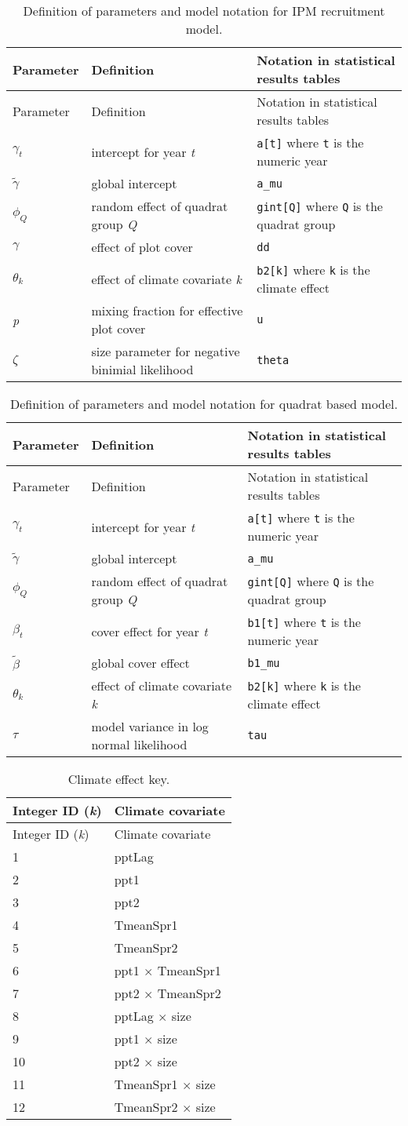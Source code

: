 \documentclass[12pt,]{article}
\begin{document}
\begin{longtable}[c]{@{}lll@{}}
\caption{Definition of parameters and model notation for IPM recruitment
model.}\tabularnewline
\toprule
Parameter & Definition & Notation in statistical results
tables\tabularnewline
\midrule
\endfirsthead
\toprule
Parameter & Definition & Notation in statistical results
tables\tabularnewline
\midrule
\endhead
\(\gamma_{t}\) & intercept for year \emph{t} & \texttt{a{[}t{]}} where
\texttt{t} is the numeric year\tabularnewline
\(\tilde{\gamma}\) & global intercept & \texttt{a\_mu}\tabularnewline
\(\phi_{Q}\) & random effect of quadrat group \emph{Q} &
\texttt{gint{[}Q{]}} where \texttt{Q} is the quadrat
group\tabularnewline
\(\gamma\) & effect of plot cover & \texttt{dd}\tabularnewline
\(\theta_{k}\) & effect of climate covariate \emph{k} &
\texttt{b2{[}k{]}} where \texttt{k} is the climate effect\tabularnewline
\emph{p} & mixing fraction for effective plot cover &
\texttt{u}\tabularnewline
\(\zeta\) & size parameter for negative binimial likelihood &
\texttt{theta}\tabularnewline
\bottomrule
\end{longtable}

\begin{longtable}[c]{@{}lll@{}}
\caption{Definition of parameters and model notation for quadrat based
model.}\tabularnewline
\toprule
Parameter & Definition & Notation in statistical results
tables\tabularnewline
\midrule
\endfirsthead
\toprule
Parameter & Definition & Notation in statistical results
tables\tabularnewline
\midrule
\endhead
\(\gamma_{t}\) & intercept for year \emph{t} & \texttt{a{[}t{]}} where
\texttt{t} is the numeric year\tabularnewline
\(\tilde{\gamma}\) & global intercept & \texttt{a\_mu}\tabularnewline
\(\phi_{Q}\) & random effect of quadrat group \emph{Q} &
\texttt{gint{[}Q{]}} where \texttt{Q} is the quadrat
group\tabularnewline
\(\beta_{t}\) & cover effect for year \emph{t} & \texttt{b1{[}t{]}}
where \texttt{t} is the numeric year\tabularnewline
\(\tilde{\beta}\) & global cover effect & \texttt{b1\_mu}\tabularnewline
\(\theta_{k}\) & effect of climate covariate \emph{k} &
\texttt{b2{[}k{]}} where \texttt{k} is the climate effect\tabularnewline
\(\tau\) & model variance in log normal likelihood &
\texttt{tau}\tabularnewline
\bottomrule
\end{longtable}

\begin{longtable}[c]{@{}ll@{}}
\caption{Climate effect key.}\tabularnewline
\toprule
Integer ID (\emph{k}) & Climate covariate\tabularnewline
\midrule
\endfirsthead
\toprule
Integer ID (\emph{k}) & Climate covariate\tabularnewline
\midrule
\endhead
1 & pptLag\tabularnewline
2 & ppt1\tabularnewline
3 & ppt2\tabularnewline
4 & TmeanSpr1\tabularnewline
5 & TmeanSpr2\tabularnewline
6 & ppt1 \(\times\) TmeanSpr1\tabularnewline
7 & ppt2 \(\times\) TmeanSpr2\tabularnewline
8 & pptLag \(\times\) size\tabularnewline
9 & ppt1 \(\times\) size\tabularnewline
10 & ppt2 \(\times\) size\tabularnewline
11 & TmeanSpr1 \(\times\) size\tabularnewline
12 & TmeanSpr2 \(\times\) size\tabularnewline
\bottomrule
\end{longtable}
\end{document}
